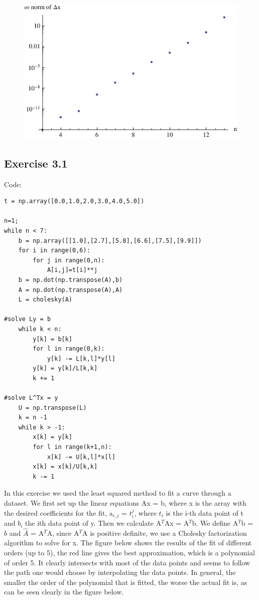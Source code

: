 \documentclass[10pt,a4paper]{article}
\begin{document}
\begin{figure}[H]
\centering
\includegraphics[scale=1.0]{2_6.pdf}
\end{figure}

\subsection*{Exercise 3.1}

Code:
\begin{lstlisting}
t = np.array([0.0,1.0,2.0,3.0,4.0,5.0])

n=1;
while n < 7:
    b = np.array([[1.0],[2.7],[5.8],[6.6],[7.5],[9.9]])
    for i in range(0,6):
        for j in range(0,n):
            A[i,j]=t[i]**j
    b = np.dot(np.transpose(A),b)
    A = np.dot(np.transpose(A),A)
    L = cholesky(A)

#solve Ly = b
    while k < n:
        y[k] = b[k]
        for l in range(0,k):
            y[k] -= L[k,l]*y[l]
        y[k] = y[k]/L[k,k]
        k += 1

#solve L^Tx = y
    U = np.transpose(L)
    k = n -1
    while k > -1:
        x[k] = y[k]
        for l in range(k+1,n):
            x[k] -= U[k,l]*x[l]
        x[k] = x[k]/U[k,k]
        k -= 1
\end{lstlisting}

\noindent In this exercise we used the least squared method to fit a curve through a dataset. We first set up the linear equations Ax = b, where x is the array with the desired coefficients for the fit, a$_{i,j}$ = $t_{i}^{j}$, where $t_{i}$ is the i-th data point of t and $b_{i}$ the ith data point of y. Then we calculate A$^T$Ax = A$^T$b. We define A$^T$b = $\hat{b}$ and $\hat{A}$ = A$^T$A, since A$^T$A is positive definite, we use a Cholesky factorization algorithm to solve for x. The figure below shows the results of the fit of different orders (up to 5), the red line gives the best approximation, which is a polynomial of order 5. It clearly intersects with most of the data points and seems to follow the path one would choose by interpolating the data points. In general, the smaller the order of the polynomial that is fitted, the worse the actual fit is, as can be seen clearly in the figure below.
\end{document}
